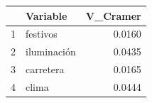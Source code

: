 \begin{table}[ht]
\centering
\begin{tabular}{rlr}
  \hline
 & Variable & V\_Cramer \\ 
  \hline
1 & festivos & 0.0160 \\ 
  2 & iluminación & 0.0435 \\ 
  3 & carretera & 0.0165 \\ 
  4 & clima & 0.0444 \\ 
   \hline
\end{tabular}
\end{table}
